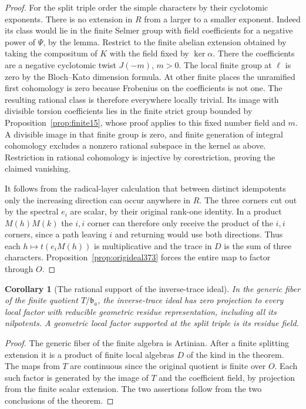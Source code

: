 \documentclass[a4paper,11pt]{article}
\newtheorem{corollary}[proposition]{Corollary}
\theoremstyle{definition}
\theoremstyle{remark}
\numberwithin{equation}{section}
\begin{document}
\begin{proof}
For the split triple order the simple characters by their
cyclotomic exponents. There is no extension in \(R\) from
a larger to a smaller exponent. Indeed its class would lie
in the finite Selmer group with field coefficients for a
negative power of \(\Psi\), by the lemma. Restrict to the
finite abelian extension obtained by taking the compositum of \(K\) with the field fixed by \(\ker\alpha\).
There the coefficients are a negative cyclotomic twist
\(J(-m)\), \(m>0\). The local finite group at \(\ell\)
is zero by the Bloch--Kato dimension formula. At other
finite places the unramified first cohomology is zero
because Frobenius on the coefficients is not one.
The resulting rational class is therefore everywhere
locally trivial. Its image with divisible torsion coefficients
lies in the finite strict group bounded by
Proposition~\ref{prop:finite15}, whose proof applies to
this fixed number field and \(m\). A divisible image in
that finite group is zero, and finite generation of integral
cohomology excludes a nonzero rational subspace in the
kernel as above. Restriction in rational cohomology is
injective by corestriction, proving the claimed vanishing.

It follows from the radical-layer calculation that between
distinct idempotents only the increasing direction can
occur anywhere in \(R\). The three corners cut out by the
spectral \(e_i\) are scalar, by their original rank-one
identity. In a product \(M(h)M(k)\) the \(i,i\) corner can
therefore only receive the product of the \(i,i\) corners, since a path leaving \(i\) and returning would use both directions.
Thus each \(h\mapsto t(e_iM(h))\) is multiplicative and
the trace in \(D\) is the sum of three characters.
Proposition~\ref{prop:origideal373} forces the entire map
to factor through \(O\).
\end{proof}

\begin{corollary}[The rational support of the inverse-trace ideal]
\label{cor:rationalsupport376}
In the generic fiber of the finite quotient
\(T/\mathfrak b_a\), the inverse-trace ideal has zero
projection to every local factor with reducible geometric
residue representation, including all its nilpotents.
A geometric local factor supported at the split triple
is its residue field.
\end{corollary}
\begin{proof}
The generic fiber of the finite algebra is Artinian.
After a finite splitting extension it is a product of finite
local algebras \(D\) of the kind in the theorem. The maps
from \(T\) are continuous since the original quotient is
finite over \(O\). Each such factor is generated by the
image of \(T\) and the coefficient field, by projection
from the finite scalar extension. The two assertions follow
from the two conclusions of the theorem.
\end{proof}
\end{document}
